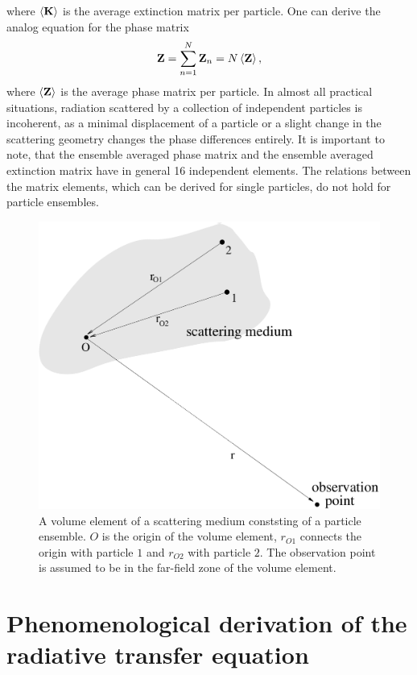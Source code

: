 where $\left\langle {\bf K} \right\rangle$ is the average extinction matrix per
particle. One can derive the analog equation for the phase matrix
 \begin{equation}
  \label{eq:rtetheory:pha_mat_tot}
  {\bf Z} = \sum_{n=1}^N  \mathbf{Z}_n = N \left\langle {\bf Z} \right\rangle,
\end{equation}
where $\left\langle {\bf Z} \right\rangle$ is the average phase matrix per particle.  In
almost all practical situations, radiation scattered by a collection
of independent particles is incoherent, as a minimal displacement of a
particle or a slight change in the scattering geometry changes the
phase differences entirely.  It is important to note, that the
ensemble averaged phase matrix and the ensemble averaged extinction
matrix have in general 16 independent elements. The relations between
the matrix elements, which can be derived for single particles, do not
hold for particle ensembles.

\begin{figure}[t]
 \begin{center}
   \includegraphics*[width=0.6\hsize]{part_ensemble}
   \caption{A volume element of a scattering medium conststing of a particle ensemble. $O$ is the origin of the volume element, $r_{O1}$ connects the origin with particle $1$ and $r_{O2}$ with particle $2$. The observation point is assumed to be in the far-field zone of the volume element.}
  \label{fig:part_ensembles}  
 \end{center}
\end{figure}


\clearpage

\section[Radiative transfer equation]{Phenomenological derivation of the radiative transfer equation}
\label{sec:rtetheory:theory_rte}

